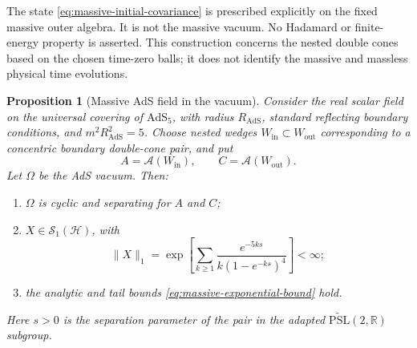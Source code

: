 \documentclass[a4paper,11pt]{article}
\newtheorem{proposition}[theorem]{Proposition}
\theoremstyle{definition}
\begin{document}
The state \eqref{eq:massive-initial-covariance} is prescribed explicitly on the
fixed massive outer algebra. It is not the massive vacuum. No Hadamard or
finite-energy property is asserted. This construction concerns the nested
double cones based on the chosen time-zero balls; it does not identify the
massive and massless physical time evolutions.

\begin{proposition}[Massive AdS field in the vacuum]
\label{prop:massive-ads}
Consider the real scalar field on the universal covering of $\mathrm{AdS}_5$,
with radius $R_{\mathrm{AdS}}$, standard reflecting boundary conditions, and
$m^2R_{\mathrm{AdS}}^2=5$. Choose nested wedges
$W_{\mathrm{in}}\subset W_{\mathrm{out}}$ corresponding to a concentric
boundary double-cone pair, and put
\[
 A=\mathcal A(W_{\mathrm{in}}),\qquad
 C=\mathcal A(W_{\mathrm{out}}).
\]
Let $\Omega$ be the AdS vacuum. Then:
\begin{enumerate}
 \item $\Omega$ is cyclic and separating for $A$ and $C$;
 \item $X\in\mathcal S_1(\mathcal H)$, with
 \begin{equation}
 \|X\|_1=
 \exp\left[\sum_{k\ge1}\frac{e^{-5ks}}{k(1-e^{-ks})^4}\right]<\infty;
 \label{eq:massive-ads-index}
 \end{equation}
 \item the analytic and tail bounds \eqref{eq:massive-exponential-bound} hold.
\end{enumerate}
Here $s>0$ is the separation parameter of the pair in the adapted
$\widetilde{\mathrm{PSL}}(2,\mathbb R)$ subgroup.
\end{proposition}
\end{document}
